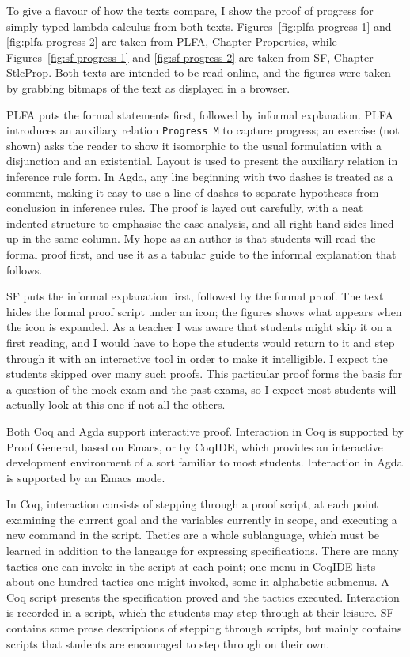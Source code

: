 \documentclass[runningheads]{llncs}
\begin{document}
To give a flavour of how the texts compare, I show the
proof of progress for simply-typed lambda calculus from both texts.
Figures~\ref{fig:plfa-progress-1} and \ref{fig:plfa-progress-2}
are taken from PLFA, Chapter Properties,
while Figures~\ref{fig:sf-progress-1} and \ref{fig:sf-progress-2}
are taken from SF, Chapter StlcProp.
Both texts are intended to be read online,
and the figures were taken by grabbing bitmaps of the text as
displayed in a browser.

PLFA puts the formal statements first, followed by informal explanation.
PLFA introduces an auxiliary relation \texttt{Progress M} to capture
progress; an exercise (not shown) asks the reader to show it isomorphic
to the usual formulation with a disjunction and an existential.
Layout is used to present the auxiliary relation in inference rule form.
In Agda, any line beginning with two dashes is treated as a comment, making
it easy to use a line of dashes to separate hypotheses from conclusion
in inference rules.  The proof is layed out carefully, with a neat
indented structure to emphasise the case analysis, and all right-hand
sides lined-up in the same column.  My hope as an author is that students
will read the formal proof first, and use it as a tabular guide
to the informal explanation that follows.

SF puts the informal explanation first, followed by the formal proof.
The text hides the formal proof script under an icon;
the figures shows what appears when the icon is expanded.
As a teacher I was aware that
students might skip it on a first reading, and I would have to hope the
students would return to it and step through it with an interactive
tool in order to make it intelligible.  I expect the students skipped over
many such proofs.  This particular proof forms the basis for a question
of the mock exam and the past exams, so I expect most students will actually
look at this one if not all the others.

Both Coq and Agda support interactive proof.  Interaction in Coq is
supported by Proof General, based on Emacs, or by CoqIDE, which
provides an interactive development environment of a sort familiar to
most students.  Interaction in Agda is supported by an Emacs mode.

In Coq, interaction consists of stepping through a proof script, at
each point examining the current goal and the variables currently in
scope, and executing a new command in the script.  Tactics are a whole
sublanguage, which must be learned in addition to the langauge for
expressing specifications.  There are many tactics one can invoke in
the script at each point; one menu in CoqIDE lists about one hundred
tactics one might invoked, some in alphabetic submenus.  A Coq
script presents the specification proved and the tactics executed.
Interaction is recorded in a script, which the students
may step through at their leisure.  SF contains some prose descriptions
of stepping through scripts, but mainly contains scripts that students
are encouraged to step through on their own.
\end{document}
